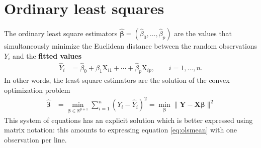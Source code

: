 \documentclass[
  11pt,
  letterpaper,
]{book}
\theoremstyle{definition}
\theoremstyle{definition}
\theoremstyle{definition}
\theoremstyle{definition}
\theoremstyle{remark}
\begin{document}
\hypertarget{ordinary-least-squares}{%
\section{Ordinary least squares}\label{ordinary-least-squares}}

The ordinary least square estimators \(\widehat{\boldsymbol{\beta}}=(\widehat{\beta}_0, \ldots, \widehat{\beta}_p)\) are the values that simultaneously minimize the Euclidean distance between the random observations \(Y_i\) and the \textbf{fitted values}
\begin{align*}
 \widehat{Y}_i &= \widehat{\beta}_0 + \widehat{\beta}_1 \mathrm{X}_{i1} + \cdots + \widehat{\beta}_p \mathrm{X}_{ip}, \qquad i =1, \ldots, n.
\end{align*}
In other words, the least square estimators are the solution of the convex optimization problem
\begin{align*}
\widehat{\boldsymbol{\beta}} &=\min_{\boldsymbol{\beta} \in \mathbb{R}^{p+1}}\sum_{i=1}^n (Y_i-\widehat{Y}_i)^2= \min_{\boldsymbol{\beta}} \|\boldsymbol{Y}-\mathbf{X}\boldsymbol{\beta}\|^2
\end{align*}
This system of equations has an explicit solution which is better expressed using matrix notation: this amounts to expressing equation \eqref{eq:olsmean} with one observation per line.
\end{document}
